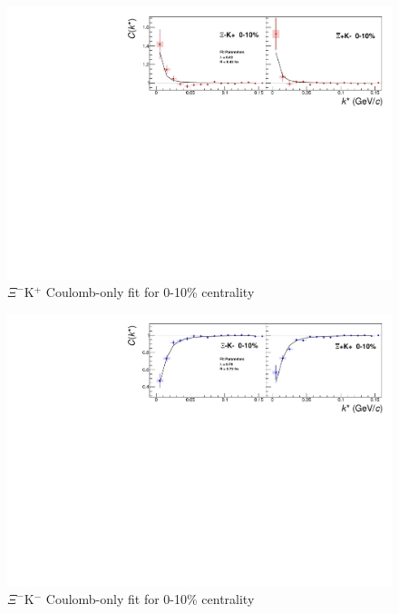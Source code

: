\documentclass[/home/jesse/Analysis/FemtoAnalysis/AnalysisNotes/AnalysisNoteJBuxton.tex]{subfiles}
\begin{document}
\begin{figure}[h]
  \centering
  \includegraphics[width=\textwidth]{7_ResultsAndDiscussion/Figures/CoulombOnlyFitXiKchP_0010.pdf}
  \caption[$\Xi^{-}$K$^{+}$ Coulomb-Only Fit]{$\Xi^{-}$K$^{+}$ Coulomb-only fit for 0-10\% centrality}
  \label{fig:XiKchPCoulombOnlyFit}
\end{figure}

\begin{figure}[h]
  \centering
  \includegraphics[width=\textwidth]{7_ResultsAndDiscussion/Figures/CoulombOnlyFitXiKchM_0010.pdf}
  \caption[$\Xi^{-}$K$^{-}$ Coulomb-Only Fit]{$\Xi^{-}$K$^{-}$ Coulomb-only fit for 0-10\% centrality}
  \label{fig:XiKchMCoulombOnlyFit}
\end{figure}
\end{document}
